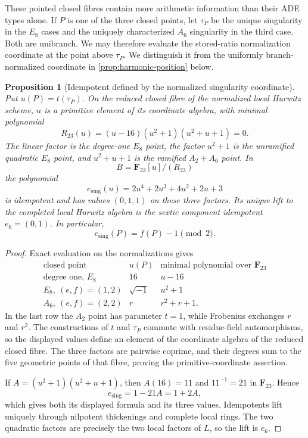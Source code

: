 \documentclass[11pt]{amsart}
\newtheorem{proposition}[proposition]{Proposition}
\theoremstyle{definition}
\theoremstyle{remark}
\newcommand{\FF}{\mathbf F}
\begin{document}
These pointed closed fibres contain more arithmetic information than their
ADE types alone.  If $P$ is one of the three closed points, let $\tau_P$ be
the unique singularity in the $E_8$ cases and the uniquely characterized
$A_6$ singularity in the third case.  Both are unibranch.  We may therefore
evaluate the stored-ratio normalization coordinate at the point above
$\tau_P$.  We distinguish it from the uniformly branch-normalized
coordinate in \cref{prop:harmonic-position} below.

\Needspace{.43\textheight}
\begin{proposition}[Idempotent defined by the normalized singularity coordinate]
\label{prop:singular-position-idempotent}
Put $u(P)=t(\tau_P)$.  On the reduced closed fibre of the normalized local
Hurwitz scheme, $u$ is a primitive element of its coordinate algebra, with
minimal polynomial
\[
 R_{23}(u)=(u-16)(u^2+1)(u^2+u+1)=0.
\]
The linear factor is the degree-one $E_8$ point, the factor $u^2+1$ is the
unramified quadratic $E_8$ point, and $u^2+u+1$ is the ramified
$A_2+A_6$ point.  In
\[
 B=\FF_{23}[u]/(R_{23})
\]
the polynomial
\[
 e_{\mathrm{sing}}(u)=2u^4+2u^3+4u^2+2u+3
\]
is idempotent and has values $(0,1,1)$ on these three factors.  Its unique
lift to the completed local Hurwitz algebra is the sextic component
idempotent $e_6=(0,1)$.  In particular,
\[
 e_{\mathrm{sing}}(P)=f(P)-1\pmod2.
\]
\end{proposition}

\begin{proof}
Exact evaluation on the normalizations gives
\[
\begin{array}{c|c|c}
\text{closed point}&u(P)&\text{minimal polynomial over }\FF_{23}\\
\hline
\text{degree one, }E_8&16&u-16\\
E_8,\ (e,f)=(1,2)&\sqrt{-1}&u^2+1\\
A_6,\ (e,f)=(2,2)&r&r^2+r+1.
\end{array}
\]
In the last row the $A_2$ point has parameter $t=1$, while Frobenius
exchanges $r$ and $r^2$.  The constructions of $t$ and $\tau_P$ commute
with residue-field automorphisms, so the displayed values define an element
of the coordinate algebra of the reduced closed fibre.  The three factors
are pairwise coprime, and their degrees sum to the five geometric points of
that fibre, proving the primitive-coordinate assertion.

If $A=(u^2+1)(u^2+u+1)$, then $A(16)=11$ and $11^{-1}=21$ in
$\FF_{23}$.  Hence
\[
 e_{\mathrm{sing}}=1-21A=1+2A,
\]
which gives both its displayed formula and its three values.  Idempotents
lift uniquely through nilpotent thickenings and complete local rings.
The two quadratic factors are precisely the two local factors of $L$, so
the lift is $e_6$.
\end{proof}
\end{document}
